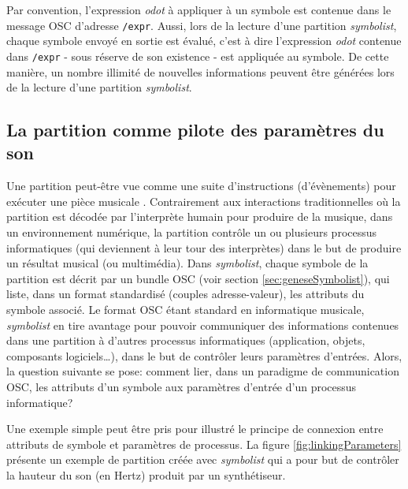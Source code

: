 Par convention, l'expression \textit{odot} à appliquer à un symbole est contenue dans le message OSC d'adresse \texttt{/expr}.
Aussi, lors de la lecture d'une partition \textit{symbolist}, chaque symbole envoyé en sortie est évalué, c'est à dire l'expression \textit{odot} contenue dans \texttt{/expr} -  sous réserve de son existence - est appliquée au symbole.
De cette manière, un nombre illimité de nouvelles informations peuvent être générées lors de la lecture d'une partition \textit{symbolist}.

\subsection{La partition comme pilote des paramètres du son} 
\label{subsec:partitionPiloteSon}
Une partition peut-être vue comme une suite d'instructions (d'évènements) pour exécuter une pièce musicale \cite{bosseur2005}. Contrairement aux interactions traditionnelles où la partition est décodée par l'interprète humain pour produire de la musique, dans un environnement numérique, la partition contrôle un ou plusieurs processus informatiques (qui deviennent à leur tour des interprètes) dans le but de produire un résultat musical (ou multimédia).
Dans \textit{symbolist}, chaque symbole de la partition est décrit par un bundle OSC (voir section \ref{sec:geneseSymbolist}), qui liste, dans un format standardisé (couples adresse-valeur), les attributs du symbole associé.
Le format OSC étant standard en informatique musicale, \textit{symbolist} en tire avantage pour pouvoir communiquer des informations contenues dans une partition à d'autres processus informatiques (application, objets, composants logiciels…), dans le but de contrôler leurs paramètres d'entrées.
Alors, la question suivante se pose: comment lier, dans un paradigme de communication OSC, les attributs d'un symbole aux paramètres d'entrée d'un processus informatique?

Une exemple simple peut être pris pour illustré le principe de connexion entre attributs de symbole et paramètres de processus. La figure \ref{fig:linkingParameters} présente un exemple de partition créée avec \textit{symbolist} qui a pour but de contrôler la hauteur du son (en Hertz) produit par un synthétiseur.

